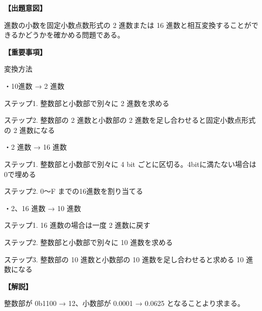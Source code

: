 \noindent \textbf{【出題意図】}

 進数の小数を固定小数点数形式の 2 進数または 16 進数と相互変換することができるかどうかを確かめる問題である。

\vspace{1em}
\noindent \textbf{【重要事項】}

\noindent 変換方法

\medskip
\noindent ・10進数 → 2 進数

\medskip
\noindent ステップ1. 整数部と小数部で別々に 2 進数を求める 

\noindent ステップ2. 整数部の 2 進数と小数部の 2 進数を足し合わせると固定小数点形式の 2 進数になる 

\medskip
\noindent ・2 進数 → 16 進数

\medskip
\noindent ステップ1. 整数部と小数部で別々に 4 bit ごとに区切る。4bitに満たない場合は0で埋める

\noindent ステップ2. 0〜F までの16進数を割り当てる


\medskip
\noindent ・2、16 進数 → 10 進数

\medskip
\noindent ステップ1. 16 進数の場合は一度 2 進数に戻す

\noindent ステップ2. 整数部と小数部で別々に 10 進数を求める 

\noindent ステップ3. 整数部の 10 進数と小数部の 10 進数を足し合わせると求める 10 進数になる 


\vspace{1em}
\noindent \textbf{【解説】}

\noindent 整数部が 0b1100 → 12、小数部が 0.0001 → 0.0625 となることより求まる。
